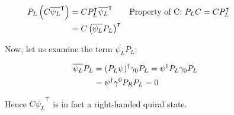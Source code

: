 \begin{align}
  &\begin{aligned}
     \mathllap{P_L \left( C \overline{\psi_L}^\intercal \right)} &= C P_L^\intercal \overline{\psi_L}^\intercal &\text{Property of C: $P_LC = C P_L^\intercal$}\\        
     \mathllap{} &= C \left( \overline{\psi_L}P_L \right)^\intercal  
  &\end{aligned}
\end{align}

Now, let us examine the term $\overline{\psi_L}P_L$:
 

\begin{align}
  &\begin{aligned}
    \mathllap{\overline{\psi_L}P_L} &= (P_L \psi)^\dagger \gamma_0 P_L = \psi^\dagger P_L \gamma_0 P_L\\
    \mathllap{} &= \psi^\dagger \gamma^0 P_R P_L = 0
    &\end{aligned}
\end{align}

Hence $C \overline{\psi_L}^\intercal$ is in fact a right-handed quiral state. 
\\






